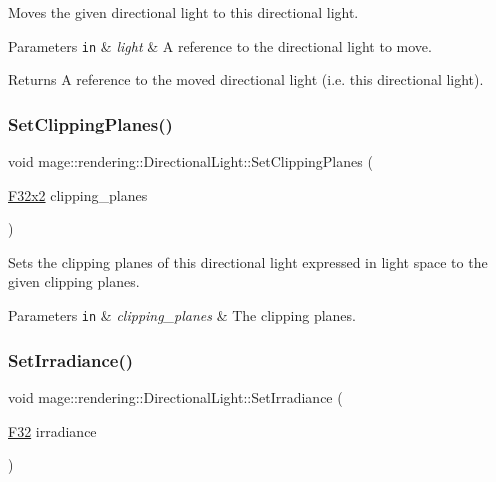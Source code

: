 Moves the given directional light to this directional light.


\begin{DoxyParams}[1]{Parameters}
\mbox{\tt in}  & {\em light} & A reference to the directional light to move. \\
\hline
\end{DoxyParams}
\begin{DoxyReturn}{Returns}
A reference to the moved directional light (i.\+e. this directional light). 
\end{DoxyReturn}
\mbox{\label{classmage_1_1rendering_1_1_directional_light_ae90562c217d876a3a2a73f36f36a700f}} 
\subsubsection{\texorpdfstring{Set\+Clipping\+Planes()}{SetClippingPlanes()}}
{\footnotesize\ttfamily void mage\+::rendering\+::\+Directional\+Light\+::\+Set\+Clipping\+Planes (\begin{DoxyParamCaption}\item[{\mbox{\hyperlink{namespacemage_aee4759dedc8def6c6dec26b5c7eddf29}{F32x2}}}]{clipping\+\_\+planes }\end{DoxyParamCaption})\hspace{0.3cm}{\ttfamily [noexcept]}}

Sets the clipping planes of this directional light expressed in light space to the given clipping planes.


\begin{DoxyParams}[1]{Parameters}
\mbox{\tt in}  & {\em clipping\+\_\+planes} & The clipping planes. \\
\hline
\end{DoxyParams}
\mbox{\label{classmage_1_1rendering_1_1_directional_light_af8570b18bfb807492317e4a98f5c7ba6}} 
\subsubsection{\texorpdfstring{Set\+Irradiance()}{SetIrradiance()}}
{\footnotesize\ttfamily void mage\+::rendering\+::\+Directional\+Light\+::\+Set\+Irradiance (\begin{DoxyParamCaption}\item[{\mbox{\hyperlink{namespacemage_aa97e833b45f06d60a0a9c4fc22ae02c0}{F32}}}]{irradiance }\end{DoxyParamCaption})\hspace{0.3cm}{\ttfamily [noexcept]}}

